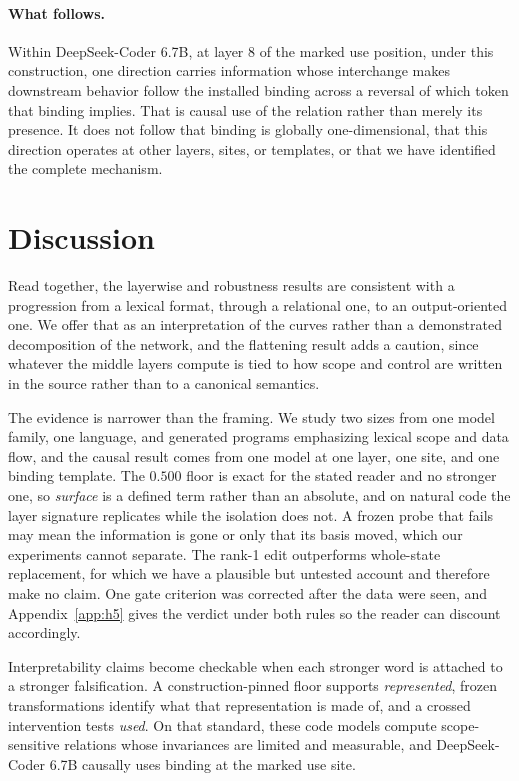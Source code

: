 \documentclass{article}
\begin{document}
\paragraph{What follows.}
Within DeepSeek-Coder 6.7B, at layer 8 of the marked use position, under this construction, one direction carries information whose interchange makes downstream behavior follow the installed binding across a reversal of which token that binding implies. That is causal use of the relation rather than merely its presence. It does not follow that binding is globally one-dimensional, that this direction operates at other layers, sites, or templates, or that we have identified the complete mechanism.

\section{Discussion}
\label{sec:discussion}

Read together, the layerwise and robustness results are consistent with a progression from a lexical format, through a relational one, to an output-oriented one. We offer that as an interpretation of the curves rather than a demonstrated decomposition of the network, and the flattening result adds a caution, since whatever the middle layers compute is tied to how scope and control are written in the source rather than to a canonical semantics.

The evidence is narrower than the framing. We study two sizes from one model family, one language, and generated programs emphasizing lexical scope and data flow, and the causal result comes from one model at one layer, one site, and one binding template. The $0.500$ floor is exact for the stated reader and no stronger one, so \emph{surface} is a defined term rather than an absolute, and on natural code the layer signature replicates while the isolation does not. A frozen probe that fails may mean the information is gone or only that its basis moved, which our experiments cannot separate. The rank-1 edit outperforms whole-state replacement, for which we have a plausible but untested account and therefore make no claim. One gate criterion was corrected after the data were seen, and Appendix~\ref{app:h5} gives the verdict under both rules so the reader can discount accordingly.

Interpretability claims become checkable when each stronger word is attached to a stronger falsification. A construction-pinned floor supports \emph{represented}, frozen transformations identify what that representation is made of, and a crossed intervention tests \emph{used}. On that standard, these code models compute scope-sensitive relations whose invariances are limited and measurable, and DeepSeek-Coder 6.7B causally uses binding at the marked use site.
\end{document}
